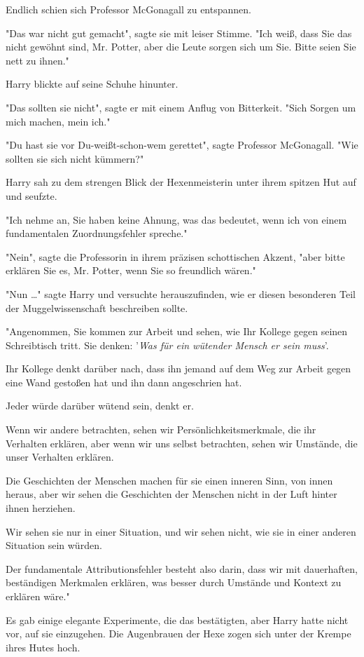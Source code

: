 {Endlich schien sich Professor McGonagall zu entspannen.

"Das war nicht gut gemacht", sagte sie mit leiser Stimme. "Ich weiß, dass Sie das nicht gewöhnt sind, Mr. Potter, aber die Leute sorgen sich um Sie. Bitte seien Sie nett zu ihnen."

Harry blickte auf seine Schuhe hinunter.

"Das sollten sie nicht", sagte er mit einem Anflug von Bitterkeit. "Sich Sorgen um mich machen, mein ich."

"Du hast sie vor Du-weißt-schon-wem gerettet", sagte Professor McGonagall. "Wie sollten sie sich nicht kümmern?"

Harry sah zu dem strengen Blick der Hexenmeisterin unter ihrem spitzen Hut auf und seufzte.

"Ich nehme an, Sie haben keine Ahnung, was das bedeutet, wenn ich von einem fundamentalen Zuordnungsfehler spreche."

"Nein", sagte die Professorin in ihrem präzisen schottischen Akzent, "aber bitte erklären Sie es, Mr. Potter, wenn Sie so freundlich wären."

"Nun …" sagte Harry und versuchte herauszufinden, wie er diesen besonderen Teil der Muggelwissenschaft beschreiben sollte.

"Angenommen, Sie kommen zur Arbeit und sehen, wie Ihr Kollege gegen seinen Schreibtisch tritt. Sie denken: '\emph{Was für ein wütender Mensch er sein muss}'.

Ihr Kollege denkt darüber nach, dass ihn jemand auf dem Weg zur Arbeit gegen eine Wand gestoßen hat und ihn dann angeschrien hat.

Jeder würde darüber wütend sein, denkt er.

Wenn wir andere betrachten, sehen wir Persönlichkeitsmerkmale, die ihr Verhalten erklären, aber wenn wir uns selbst betrachten, sehen wir Umstände, die unser Verhalten erklären.

Die Geschichten der Menschen machen für sie einen inneren Sinn, von innen heraus, aber wir sehen die Geschichten der Menschen nicht in der Luft hinter ihnen herziehen.

Wir sehen sie nur in einer Situation, und wir sehen nicht, wie sie in einer anderen Situation sein würden.

Der fundamentale Attributionsfehler besteht also darin, dass wir mit dauerhaften, beständigen Merkmalen erklären, was besser durch Umstände und Kontext zu erklären wäre."

Es gab einige elegante Experimente, die das bestätigten, aber Harry hatte nicht vor, auf sie einzugehen. Die Augenbrauen der Hexe zogen sich unter der Krempe ihres Hutes hoch.

}
